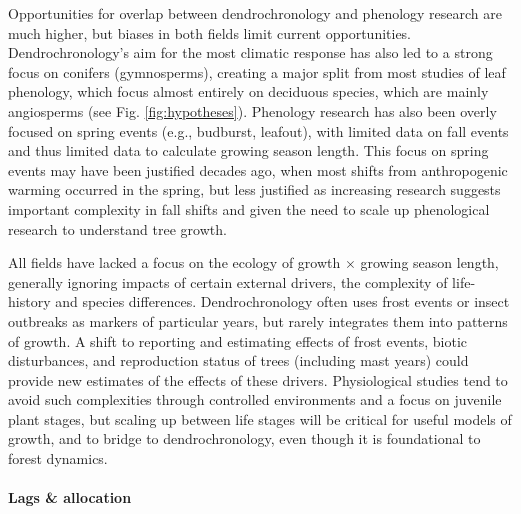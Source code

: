 \documentclass[11pt]{article}
\begin{document}
Opportunities for overlap between dendrochronology and phenology research are much higher, but biases in both fields limit current opportunities. Dendrochronology's aim for the most climatic response has also led to a strong focus on conifers (gymnosperms), creating a major split from most studies of leaf phenology, which focus almost entirely on deciduous species, which are mainly angiosperms (see Fig. \ref{fig:hypotheses}). Phenology research has also been overly focused on spring events (e.g., budburst, leafout), with limited data on fall events and thus limited data to calculate growing season length. This focus on spring events may have been justified decades ago, when most shifts from anthropogenic warming occurred in the spring, but less justified as increasing research suggests important complexity in fall shifts \citep{gill2015,zohner2023effect} and given the need to scale up phenological research to understand tree growth.

All fields have lacked a focus on the ecology of growth $\times$ growing season length, generally ignoring impacts of certain external drivers, the complexity of life-history and species differences. Dendrochronology often uses frost events or insect outbreaks as markers of particular years, but rarely integrates them into patterns of growth. A shift to reporting and estimating effects of frost events, biotic disturbances, and reproduction status of trees (including mast years) could provide new estimates of the effects of these drivers. Physiological studies tend to avoid such complexities through controlled environments and a focus on juvenile plant stages, but scaling up between life stages will be critical for useful models of growth, and to bridge to dendrochronology, even though it is foundational to forest dynamics. %

\paragraph{Lags \& allocation}
\end{document}
